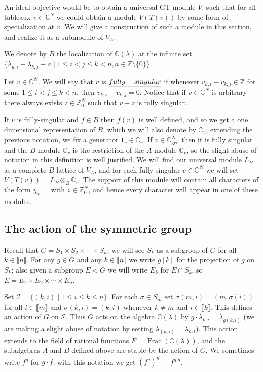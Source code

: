 \documentclass[11pt,fleqn]{article}
\newcommand\CC{\mathbb C}
\newcommand\ZZ{\mathbb Z}
\newcommand\I{\mathcal I}
\newcommand\ot{\otimes}
\newcommand\gen{\mathsf{gen}}
\newcommand\interval[1]{\llbracket #1 \rrbracket}
\DeclareMathOperator\Frac{Frac}
\begin{document}
An ideal objective would be to obtain a universal GT-module $V$, such that for
all tableaux $v \in \CC^N$ we could obtain a module $V(T(v))$ by some form of
specialization at $v$. We will give a construction of such a module in this 
section, and realize it as a submodule of $V_A$.

\begin{Definition}
We denote by $B$ the localization of $\CC(\lambda)$ at the infinite set
$\{\lambda_{k,i} - \lambda_{k,j} - a \mid 1 \leq i < j \leq k < n, a \in 
\ZZ \setminus \{0\}\}$.
\end{Definition}
Let $v \in \CC^N$. We will say that $v$ is $\emph{fully-singular}$ if whenever
$v_{k,i} - v_{k,j} \in \ZZ$ for some $1 \leq i < j \leq k < n$, then $v_{k,i}
- v_{k,j} = 0$. Notice that if $v \in \CC^N$ is arbitrary there always exists
$z \in \ZZ^N_0$ such that $v+z$ is fully singular.

If $v$ is fully-singular and $f \in B$ then $f(v)$ is well defined, and so we 
get a one dimensional representation of $B$, which we will also denote by 
$\CC_v$; extending the previous notation, we fix a generator $1_v \in \CC_v$. 
If $v \in \CC^N_\gen$ then it is fully singular and the $B$-module $\CC_v$ is 
the restriction of the $A$-module $\CC_v$, so the slight abuse of notation in 
this definition is well justified. We will find our universal module $L_B$ as 
a complete $B$-lattice of $V_A$, and for each fully singular $v \in \CC^N$
we will set $V(T(v)) = L_B \ot_B \CC_v$. The support of this module will
contain all characters of the form $\chi_{v+z}$ with $z \in \ZZ^N_0$, and hence
every character will appear in one of these modules.

\subsection{The action of the symmetric group}
Recall that $G = S_1 \times S_2 \times \cdots \times S_n$; we will see $S_k$ 
as a subgroup of $G$ for all $k \in \interval{n}$. For any $g \in G$ and any 
$k \in \interval n$ we write $g[k]$ for the projection of $g$ on $S_k$; also
given a subgroup $E < G$ we will write $E_k$ for $E \cap S_k$, so $E = E_1 
\times E_2 \times \cdots \times E_n$.

Set $\I = \{(k,i) \mid 1 \leq i \leq k \leq n\}$. For each $\sigma \in S_m$ set
$\sigma(m,i) = (m,\sigma(i))$ for all $i \in \interval m$ and $\sigma(k,i) = 
(k,i)$ whenever $k \neq m$ and $i \in \interval k$. This defines an action of 
$G$ on $\I$. Thus $G$ acts on the algebra $\CC(\lambda)$ by $g\cdot 
\lambda_{k,i} = \lambda_{g(k,i)}$ (we are making a slight abuse of notation 
by setting $\lambda_{(k,i)} = \lambda_{k,i}$). This action extends
to the field of rational functions $F = \Frac(\CC(\lambda))$, and the 
subalgebras $A$ and $B$ defined above are stable by the action of $G$. We 
sometimes write $f^g$ for $g \cdot f$; with this notation we get $(f^g)^{g'} = 
f^{g'g}$.
\end{document}
